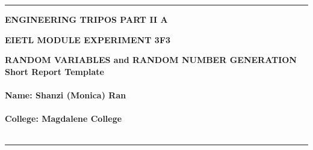 \documentclass[12pt]{article}
\begin{document}
\noindent
\rule{15.7cm}{0.5mm}


\begin{center}
{\bf ENGINEERING TRIPOS PART II A}
\end{center}
\vspace{0.5cm} {\bf EIETL \hfill MODULE EXPERIMENT 3F3}
\vspace{0.5cm}
\begin{center}
{\bf RANDOM VARIABLES and RANDOM NUMBER GENERATION\\
Short  Report Template\\\hfill \\Name: Shanzi (Monica) Ran\\\hfill\\
College: Magdalene College\\\hfill
\\
}
\end{center}
\rule{15.7cm}{0.5mm}



\vspace*{1cm}
\begin{center}
\end{center}
\vspace*{1cm}
\end{document}
